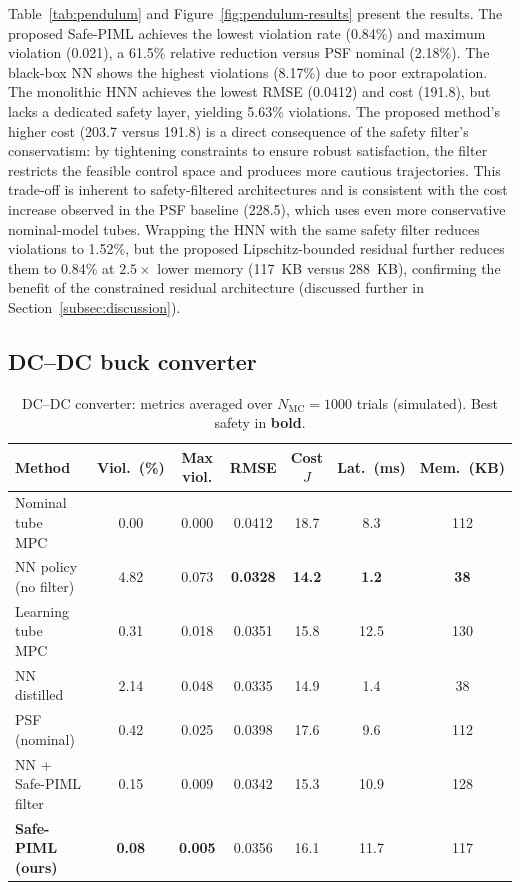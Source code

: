 \documentclass[12pt,a4paper]{article}
\begin{document}
Table~\ref{tab:pendulum} and Figure~\ref{fig:pendulum-results} present
the results. The proposed Safe-PIML achieves the lowest violation rate
(0.84\%) and maximum violation (0.021), a 61.5\% relative reduction
versus PSF nominal (2.18\%). The black-box NN shows the highest
violations (8.17\%) due to poor extrapolation. The monolithic HNN
achieves the lowest RMSE (0.0412) and cost (191.8), but lacks a
dedicated safety layer, yielding 5.63\% violations. The proposed
method's higher cost (203.7 versus 191.8) is a direct consequence of
the safety filter's conservatism: by tightening constraints to ensure
robust satisfaction, the filter restricts the feasible control space and
produces more cautious trajectories. This trade-off is inherent to
safety-filtered architectures and is consistent with the cost increase
observed in the PSF baseline (228.5), which uses even more conservative
nominal-model tubes. Wrapping the HNN with the same safety filter
reduces violations to 1.52\%, but the proposed Lipschitz-bounded
residual further reduces them to 0.84\% at $2.5\times$ lower memory
(117~KB versus 288~KB), confirming the benefit of the constrained
residual architecture (discussed further in
Section~\ref{subsec:discussion}).

\subsection{DC--DC buck converter}
\label{subsec:results-dcdc}

\begin{table}[t]
  \centering\scriptsize
  \caption{DC--DC converter: metrics averaged over
  $N_{\mathrm{MC}}=1000$ trials (simulated). Best safety in
  \textbf{bold}.}
  \label{tab:dcdc}
  \begin{tabular*}{\textwidth}{@{\extracolsep{\fill}}lcccccc}
    \toprule
    Method &
      Viol.\ (\%) & Max viol. & RMSE & Cost $J$ &
      Lat.\ (ms) & Mem.\ (KB) \\
    \midrule
    Nominal tube MPC~\cite{mayne2005robust}            & 0.00 & 0.000 & 0.0412 & 18.7 & 8.3 & 112 \\
    NN policy (no filter)~\cite{schwan2023evanqp}      & 4.82 & 0.073 & \textbf{0.0328} & \textbf{14.2} & \textbf{1.2} & \textbf{38} \\
    Learning tube MPC~\cite{gao2024rigid}              & 0.31 & 0.018 & 0.0351 & 15.8 & 12.5 & 130 \\
    NN distilled~\cite{tagliabue2022gps}               & 2.14 & 0.048 & 0.0335 & 14.9 & 1.4 & 38 \\
    PSF (nominal)~\cite{wabersich2021psf}              & 0.42 & 0.025 & 0.0398 & 17.6 & 9.6 & 112 \\
    NN + Safe-PIML filter                               & 0.15 & 0.009 & 0.0342 & 15.3 & 10.9 & 128 \\
    \textbf{Safe-PIML (ours)}                           & \textbf{0.08} & \textbf{0.005} & 0.0356 & 16.1 & 11.7 & 117 \\
    \bottomrule
  \end{tabular*}
\end{table}
\end{document}
